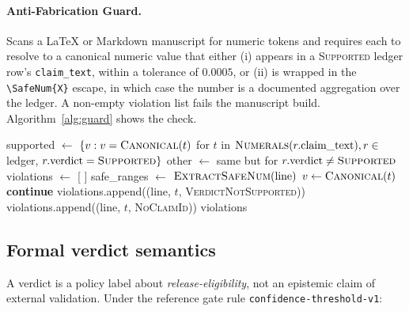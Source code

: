 \documentclass{article}
\newcommand{\SafeNum}[1]{#1}
\begin{document}
\paragraph{Anti-Fabrication Guard.} Scans a LaTeX or Markdown manuscript for numeric tokens and requires each to resolve to a canonical numeric value that either (i) appears in a \textsc{Supported} ledger row's \texttt{claim\_text}, within a tolerance of $\SafeNum{0.0005}$, or (ii) is wrapped in the \texttt{\textbackslash SafeNum\{X\}} escape, in which case the number is a documented aggregation over the ledger. A non-empty violation list fails the manuscript build. Algorithm~\ref{alg:guard} shows the check.

\begin{algorithm}[t]
\caption{\textsc{CheckManuscript} --- the Anti-Fabrication Guard (Phase C1 semantics).}
\label{alg:guard}
\begin{algorithmic}[1]
    \State supported $\gets$ $\{v : v = \textsc{Canonical}(t)$ for $t$ in $\textsc{Numerals}(r.\text{claim\_text}), r \in$ ledger, $r.\text{verdict} = \textsc{Supported}\}$
    \State other $\gets$ same but for $r.\text{verdict} \neq \textsc{Supported}$
    \State violations $\gets$ [ ]
        \State safe\_ranges $\gets$ $\textsc{ExtractSafeNum}(\text{line})$
            \State $v \gets \textsc{Canonical}(t)$
                \State \textbf{continue}
                \State violations.append((line, $t$, \textsc{VerdictNotSupported}))
            \Else
                \State violations.append((line, $t$, \textsc{NoClaimId}))
            \EndIf
        \EndFor
    \EndFor
    \State \Return violations
\EndFunction
\end{algorithmic}
\end{algorithm}

\subsection{Formal verdict semantics}
\label{sec:verdict-semantics}

A verdict is a policy label about \emph{release-eligibility}, not an epistemic claim of external validation. Under the reference gate rule \texttt{confidence-threshold-v1}:
\end{document}
